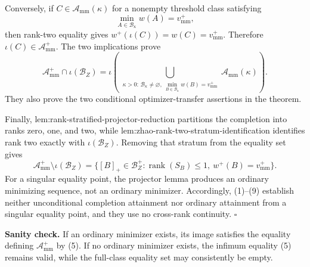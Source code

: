 Conversely, if \(C\in\mathcal A_{\mathrm{mm}}(\kappa)\) for a nonempty threshold class satisfying
\[
\min_{A\in\mathcal B_\kappa}w(A)=v_{\mathrm{mm}}^+,
\]
then rank-two equality gives \(w^+(\iota(C))=w(C)=v_{\mathrm{mm}}^+\).  Therefore \(\iota(C)\in\mathcal A_{\mathrm{mm}}^+\).  The two implications prove
\[
\mathcal A_{\mathrm{mm}}^+\cap\iota(\mathcal B_Z)
=\iota\!\left(
\bigcup_{\substack{\kappa>0:\,
\mathcal B_\kappa\ne\varnothing,\ 
\min_{B\in\mathcal B_\kappa}w(B)=v_{\mathrm{mm}}^+}}
\mathcal A_{\mathrm{mm}}(\kappa)\right).                          \tag{8}
\]
They also prove the two conditional optimizer-transfer assertions in the theorem.

Finally, lem:rank-stratified-projector-reduction partitions the completion into ranks zero, one, and two, while lem:zhao-rank-two-stratum-identification identifies rank two exactly with \(\iota(\mathcal B_Z)\).  Removing that stratum from the equality set gives
\[
\mathcal A_{\mathrm{mm}}^+\setminus\iota(\mathcal B_Z)
=\{[B]_+\in\mathcal B_Z^+:\operatorname{rank}(S_B)\le1,
\ w^+(B)=v_{\mathrm{mm}}^+\}.                                    \tag{9}
\]
For a singular equality point, the projector lemma produces an ordinary minimizing sequence, not an ordinary minimizer.  Accordingly, (1)--(9) establish neither unconditional completion attainment nor ordinary attainment from a singular equality point, and they use no cross-rank continuity. \(\square\)

\textbf{Sanity check.}
If an ordinary minimizer exists, its image satisfies the equality defining \(\mathcal A_{\mathrm{mm}}^+\) by (5).  If no ordinary minimizer exists, the infimum equality (5) remains valid, while the full-class equality set may consistently be empty.